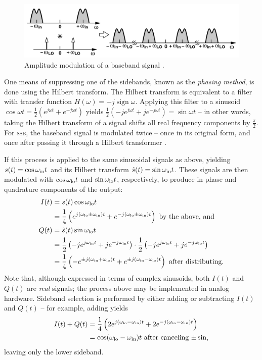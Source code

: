 \documentclass[12pt]{article}
\newcommand{\ssb}{\textsc{ssb}\xspace}
\DeclareMathOperator{\sign}{sign}
\begin{document}
\begin{figure}[h]
	\centering
	\includegraphics[width=.9\textwidth]{razavi-am.png}
	\caption{Amplitude modulation of a baseband signal
	\autocite{rf-microelectronics}.}
	\label{fig:razavi-am}
\end{figure}

One means of suppressing one of the sidebands, known as the \emph{phasing
method}, is done using the Hilbert transform. The Hilbert transform is
equivalent to a filter with transfer function \(H(\omega) = -j \sign \omega\).
Applying this filter to a  sinusoid \(\cos \omega t = \frac 1 2 (e^{j \omega t}
+ e^{-j \omega t})\) yields \(\frac 1 2 (-j e^{j \omega t} + j e^{-j \omega t})
= \sin \omega t\) -- in other words, taking the Hilbert transform of a signal
shifts all real frequency components by \(\frac \pi 2\). For \ssb, the baseband
signal is modulated twice -- once in its original form, and once after passing
it through a Hilbert transformer \autocite{ssb-tretter}.

If this process is applied to the same sinusoidal signals as above, yielding
\(s(t) = \cos \omega_\text{in} t \) and its Hilbert transform \(\hat s(t) = \sin \omega_\text{in} t\).
These signals are then modulated with \(\cos \omega_\text{lo} t\) and \(\sin \omega_\text{lo} t\),
respectively, to produce in-phase and quadrature components of the output:
\begin{align*}
	I(t) &= s(t) \cos \omega_\text{lo} t \\
		&= \frac 1 4 \left(
			e^{j (\omega_\text{lo} \pm \omega_\text{in}) t} + e^{-j (\omega_\text{lo} \pm \omega_\text{in}) t}
		\right) \text{ by the above, and} \\
	Q(t) &= \hat s(t) \sin \omega_\text{lo} t \\
		&= \frac 1 2 \left(-j e^{j \omega_\text{in} t} + j e^{-j \omega_\text{in} t}\right)
			\cdot \frac 1 2 \left(
				-j e^{j \omega_\text{lo} t} + j e^{-j \omega_\text{lo} t}\right
			) \\
		&= \frac 1 4 \left(
			-e^{\pm j (\omega_\text{in} + \omega_\text{lo}) t} + e^{\pm j (\omega_\text{in} - \omega_\text{lo}) t}
		\right) \text { after distributing.}
\end{align*}
Note that, although expressed in terms of complex sinusoids, both \(I(t)\) and
\(Q(t)\) are \emph{real} signals; the process above may be implemented in
analog hardware. Sideband selection is performed by either adding or
subtracting \(I(t)\) and \(Q(t)\) -- for example, adding yields
\begin{align*}
	I(t) + Q(t) &= \frac 1 4 \left(
		2 e^{j (\omega_\text{lo} - \omega_\text{in}) t} + 2 e^{-j (\omega_\text{lo} - \omega_\text{in}) t}
	\right) \\
	&= \cos (\omega_\text{lo} - \omega_\text{in}) t \text{ after canceling \(\pm \sin\),}
\end{align*}
leaving only the lower sideband.
\end{document}
